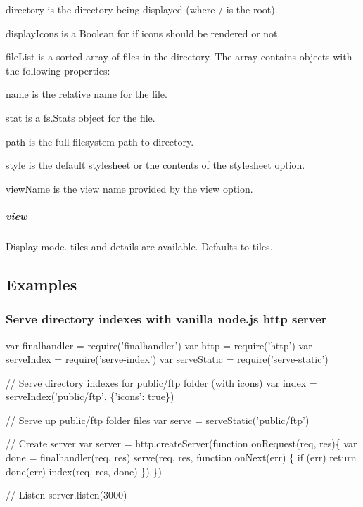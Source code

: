 \begin{DoxyItemize}
\item {\ttfamily directory} is the directory being displayed (where {\ttfamily /} is the root).
\item {\ttfamily display\+Icons} is a Boolean for if icons should be rendered or not.
\item {\ttfamily file\+List} is a sorted array of files in the directory. The array contains objects with the following properties\+:
\begin{DoxyItemize}
\item {\ttfamily name} is the relative name for the file.
\item {\ttfamily stat} is a {\ttfamily fs.\+Stats} object for the file.
\end{DoxyItemize}
\item {\ttfamily path} is the full filesystem path to {\ttfamily directory}.
\item {\ttfamily style} is the default stylesheet or the contents of the {\ttfamily stylesheet} option.
\item {\ttfamily view\+Name} is the view name provided by the {\ttfamily view} option.
\end{DoxyItemize}

\subparagraph*{view}

Display mode. {\ttfamily tiles} and {\ttfamily details} are available. Defaults to {\ttfamily tiles}.

\subsection*{Examples}

\subsubsection*{Serve directory indexes with vanilla node.\+js http server}


\begin{DoxyCode}
var finalhandler = require('finalhandler')
var http = require('http')
var serveIndex = require('serve-index')
var serveStatic = require('serve-static')

// Serve directory indexes for public/ftp folder (with icons)
var index = serveIndex('public/ftp', \{'icons': true\})

// Serve up public/ftp folder files
var serve = serveStatic('public/ftp')

// Create server
var server = http.createServer(function onRequest(req, res)\{
  var done = finalhandler(req, res)
  serve(req, res, function onNext(err) \{
    if (err) return done(err)
    index(req, res, done)
  \})
\})

// Listen
server.listen(3000)
\end{DoxyCode}


